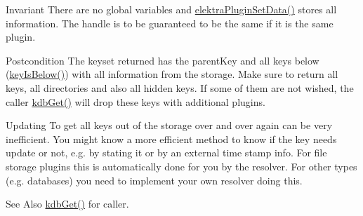 \begin{DoxyInvariant}{Invariant}
There are no global variables and \hyperlink{group__plugin_gaf4b941a52ff55d0ca2a9158d90208ef2}{elektra\-Plugin\-Set\-Data()} stores all information. The handle is to be guaranteed to be the same if it is the same plugin.
\end{DoxyInvariant}
\begin{DoxyPostcond}{Postcondition}
The keyset {\ttfamily returned} has the {\ttfamily parent\-Key} and all keys below (\hyperlink{group__keytest_ga03332b5d97c76a4fd2640aca4762b8df}{key\-Is\-Below()}) with all information from the storage. Make sure to return all keys, all directories and also all hidden keys. If some of them are not wished, the caller \hyperlink{group__kdb_ga28e385fd9cb7ccfe0b2f1ed2f62453a1}{kdb\-Get()} will drop these keys with additional plugins.
\end{DoxyPostcond}
\begin{DoxyParagraph}{Updating}
To get all keys out of the storage over and over again can be very inefficient. You might know a more efficient method to know if the key needs update or not, e.\-g. by stating it or by an external time stamp info. For file storage plugins this is automatically done for you by the resolver. For other types (e.\-g. databases) you need to implement your own resolver doing this.
\end{DoxyParagraph}
\begin{DoxySeeAlso}{See Also}
\hyperlink{group__kdb_ga28e385fd9cb7ccfe0b2f1ed2f62453a1}{kdb\-Get()} for caller.
\end{DoxySeeAlso}

